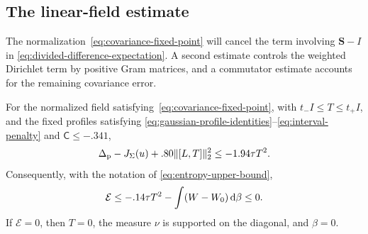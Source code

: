 \subsection{The linear-field estimate}

The normalization~\eqref{eq:covariance-fixed-point} will cancel the term involving $\mathbf{S}-I$ in \eqref{eq:divided-difference-expectation}.  A second estimate controls the weighted Dirichlet term by positive Gram matrices, and a commutator estimate accounts for the remaining covariance error.

\begin{proposition}\label{prop:linear-field-bound}
For the normalized field satisfying~\eqref{eq:covariance-fixed-point}, with $t_-I\le T\le t_+I$, and the fixed profiles satisfying \eqref{eq:gaussian-profile-identities}--\eqref{eq:interval-penalty} and $\mathsf C\le-.341$,
\[
 \Delta_{\rm p}-J_\Sigma(u)+.80\|[L,T]\|_2^2
       \le -1.94\tau T^2.
\]
Consequently, with the notation of \eqref{eq:entropy-upper-bound},
\[
 \mathcal{E}\le -.14\tau T^2-\int(W-W_0)\,\mathrm{d} \beta\le0.
\]
If $\mathcal{E}=0$, then $T=0$, the measure $\nu$ is supported on the diagonal, and $\beta=0$.
\end{proposition}

